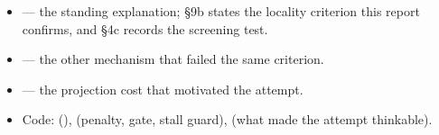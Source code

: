 \documentclass[11pt,a4paper]{article}
\begin{document}
\begin{itemize}
  \item {} --- the
    standing explanation; \S9b states the locality criterion this report
    confirms, and \S4c records the screening test.
  \item {} --- the
    other mechanism that failed the same criterion.
  \item {} --- the projection cost
    that motivated the attempt.
  \item Code: 
    (),
     (penalty, gate, stall guard),
     (what made the attempt
    thinkable).
\end{itemize}
\end{document}
